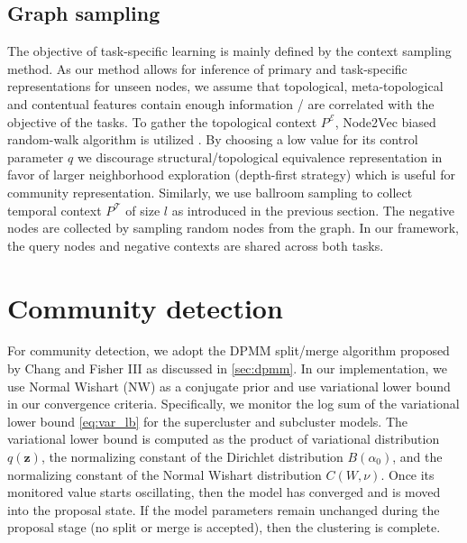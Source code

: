 \subsection{Graph sampling}
The objective of task-specific learning is mainly defined by the context sampling method.
As our method allows for inference of primary and task-specific representations for unseen nodes, we assume that topological, meta-topological and contentual features contain enough information / are correlated with the objective of the tasks.
%
To gather the topological context $P^{\mathcal{E}}$, Node2Vec biased random-walk algorithm is utilized \cite{groverNode2vecScalableFeature2016}.
By choosing a low value for its control parameter $q$ we discourage structural/topological equivalence representation in favor of larger neighborhood exploration (depth-first strategy) which is useful for community representation.
Similarly, we use ballroom sampling to collect temporal context $P^{\mathcal{T}}$ of size $l$ as introduced in the previous section.
The negative nodes are collected by sampling random nodes from the graph.
In our framework, the query nodes and negative contexts are shared across both tasks. 

\section{Community detection}
For community detection, we adopt the DPMM split/merge algorithm proposed by Chang and Fisher III \cite{changParallelSamplingDP2013a} as discussed in \cref{sec:dpmm}.
In our implementation, we use Normal Wishart (NW) as a conjugate prior and use variational lower bound in our convergence criteria.
%
Specifically, we monitor the log sum of the variational lower bound \cref{eq:var_lb} for the supercluster and subcluster models. 
The variational lower bound is computed as the product of variational distribution $q(\mathbf{z})$, the normalizing constant of the Dirichlet distribution $B(\alpha_0)$, and the normalizing constant of the Normal Wishart distribution $C(W, \nu)$.
Once its monitored value starts oscillating, then the model has converged and is moved into the proposal state.
If the model parameters remain unchanged during the proposal stage (no split or merge is accepted), then the clustering is complete.

